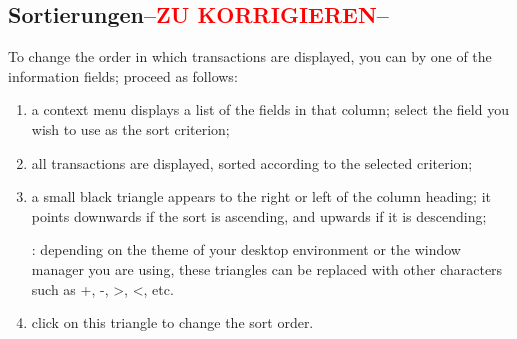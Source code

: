 \subsection{Sortierungen\textcolor{red}{--ZU KORRIGIEREN--}\label{plannedtransactions-list-sorts}}
To change the order in which transactions are displayed, you can  by one of the information fields; proceed as follows:

\begin{enumerate}
	\item a context menu displays a list of the fields in that column; select the field you wish to use as the sort criterion;
	\item all transactions are displayed, sorted according to the selected criterion;
	\item a small black triangle appears to the right or left of the column heading; it points downwards if the sort is ascending, and upwards if it is descending;
	
	\Note{}: depending on the theme of your desktop environment or the window manager you are using, these triangles can be replaced with other characters such as +, -, >, <, etc.
	\item click on this triangle to change the sort order.
\end{enumerate}

